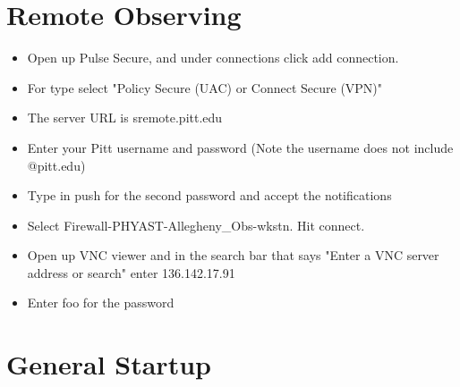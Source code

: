 \documentclass[11pt]{report}
\begin{document}
\section{Remote Observing}

\begin{itemize}
\item Open up Pulse Secure, and under connections click add connection.
\item For type select "Policy Secure (UAC) or Connect Secure (VPN)"
\item The server URL is sremote.pitt.edu
\item Enter your Pitt username and password (Note the username does not include @pitt.edu)
\item Type in push for the second password and accept the notifications
\item Select Firewall-PHYAST-Allegheny_Obs-wkstn. Hit connect.
\item Open up VNC viewer and in the search bar that says "Enter a VNC server address or search" enter 136.142.17.91
\item Enter foo for the password
\end{itemize}

\section{General Startup}
\end{document}

